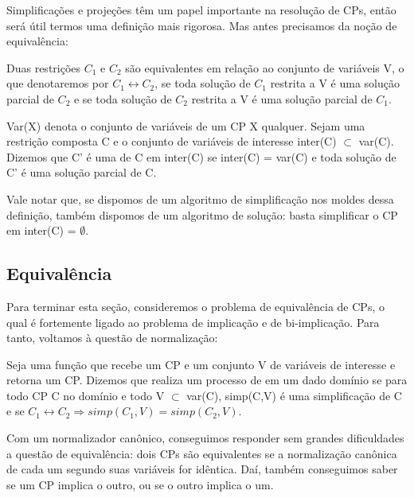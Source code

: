 \documentclass{article}
\begin{document}
Simplificações e projeções têm um papel importante na resolução de CPs, então será útil termos uma definição mais rigorosa. Mas antes precisamos da noção de equivalência:

\begin{definition}
  Duas restrições  $C_1$ e $C_2$ são equivalentes em relação ao
  conjunto de variáveis V, o que denotaremos por $C_1 \leftrightarrow C_2$, se toda solução de $C_1$
  restrita a V é uma solução parcial de $C_2$ e se toda solução de $C_2$ restrita a V é uma solução parcial de $C_1$.
\end{definition}

\begin{definition}
  Var(X) denota o conjunto de variáveis de um CP X qualquer. Sejam uma restrição composta C e o conjunto de variáveis de interesse inter(C) $\subset$ var(C). Dizemos que C' é uma  de C em inter(C) se inter(C) = var(C) e toda solução de C' é uma solução parcial de C.
\end{definition}

Vale notar que, se dispomos de um algoritmo de simplificação nos moldes dessa definição, também dispomos de um algoritmo de solução: basta simplificar o CP em inter(C) = $\emptyset$.

\subsection{Equivalência}

  Para terminar esta seção, consideremos o problema de equivalência de CPs, o qual é fortemente ligado ao problema de implicação e de bi-implicação. Para tanto, voltamos à questão de normalização:

\begin{definition}
    Seja  uma função que recebe um CP e um conjunto V de variáveis de interesse e retorna um CP. Dizemos que  realiza um processo de  em um dado domínio se para todo CP C no domínio e todo V $\subset$ var(C), simp(C,V) é uma simplificação de C e se $C_1 \leftrightarrow C_2 \Rightarrow simp(C_1,V) = simp(C_2,V)$.
\end{definition}

  Com um normalizador canônico, conseguimos responder sem grandes dificuldades a questão de equivalência: dois CPs são equivalentes se a normalização canônica de cada um segundo suas variáveis for idêntica. Daí, também conseguimos saber se um CP implica o outro, ou se o outro implica o um.
\end{document}
